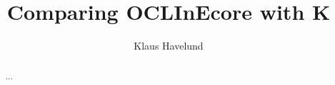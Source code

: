 \documentclass{llncs}
\title{Comparing OCLInEcore with K}
\author{Klaus Havelund}
\institute{
  Jet Propulsion Laboratory\\
  California Institute of Technology\\
  California, USA
}
\begin{document}
\maketitle

\begin{abstract}
...
\end{abstract}






\appendix
%
\end{document}
